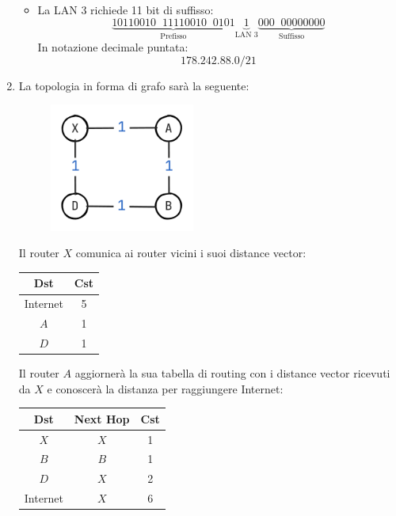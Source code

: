 \documentclass[a4paper]{article}
\begin{document}
\begin{enumerate}
\begin{itemize}
    \item La LAN 3 richiede 11 bit di suffisso:
      \[
        \underbrace{10110010 \;\; 11110010 \;\; 0101}_{\text{Prefisso}}
        \underbrace{1}_{\text{LAN 3}}
        \underbrace{000 \;\; 00000000}_{\text{Suffisso}}
      \]
      In notazione decimale puntata:
      \[
      178.242.88.0/21
      \] 
  \end{itemize}

\item 
  La topologia in forma di grafo sarà la seguente:
  \begin{figure}[H]
    \centering
    \includegraphics[width=0.45\textwidth]{../figures/esercitazione-es7-2-tcp}
  \end{figure}
  \noindent
  Il router \( X \) comunica ai router vicini i suoi distance vector:
  \begin{table}[H]
    \centering
    \begin{tabular}{c|c}
      \textbf{Dst} & \textbf{Cst}\\
      \hline
      Internet & 5\\
      \( A \) & 1\\
      \( D \) & 1\\
    \end{tabular}
  \end{table}
  \noindent
  Il router \( A \) aggiornerà la sua tabella di routing con i distance vector ricevuti
  da \( X \) e conoscerà la distanza per raggiungere Internet:
  \begin{table}[H]
    \centering
    \begin{tabular}{c|c|c}
      \textbf{Dst} & \textbf{Next Hop} & \textbf{Cst}\\
      \hline
      \( X \) & \( X \) & 1\\
      \( B \) & \( B \) & 1\\
      \( D \) & \( X \) & 2\\
      Internet & \( X \) & 6\\
    \end{tabular}
  \end{table}

\end{enumerate}
\end{document}
